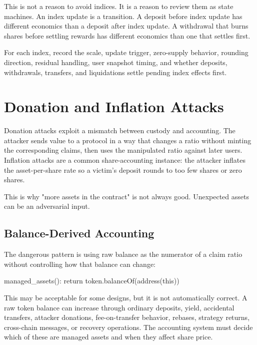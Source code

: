 This is not a reason to avoid indices. It is a reason to review them as state machines. An index update is a transition. A deposit before index update has different economics than a deposit after index update. A withdrawal that burns shares before settling rewards has different economics than one that settles first.

\begin{artifactbox}
For each index, record the scale, update trigger, zero-supply behavior, rounding direction, residual handling, user snapshot timing, and whether deposits, withdrawals, transfers, and liquidations settle pending index effects first.
\end{artifactbox}

\section{Donation and Inflation Attacks}

Donation attacks exploit a mismatch between custody and accounting. The attacker sends value to a protocol in a way that changes a ratio without minting the corresponding claims, then uses the manipulated ratio against later users. Inflation attacks are a common share-accounting instance: the attacker inflates the asset-per-share rate so a victim's deposit rounds to too few shares or zero shares.

This is why "more assets in the contract" is not always good. Unexpected assets can be an adversarial input.

\subsection{Balance-Derived Accounting}

The dangerous pattern is using raw balance as the numerator of a claim ratio without controlling how that balance can change:

\begin{codeblock}
managed_assets():
    return token.balanceOf(address(this))
\end{codeblock}

This may be acceptable for some designs, but it is not automatically correct. A raw token balance can increase through ordinary deposits, yield, accidental transfers, attacker donations, fee-on-transfer behavior, rebases, strategy returns, cross-chain messages, or recovery operations. The accounting system must decide which of these are managed assets and when they affect share price.

